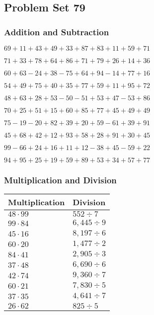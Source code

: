 \hypertarget{problem-set-79}{%
\subsection{Problem Set 79}\label{problem-set-79}}

\hypertarget{addition-and-subtraction}{%
\subsubsection{Addition and
Subtraction}\label{addition-and-subtraction}}

\(69+11+43+49+33+87+83+11+59+71\)

\(71+33+78+64+86+71+79+26+14+36\)

\(60+63-24+38-75+64+94-14+77+16\)

\(54+49+75+40+35+77+59+11+95+72\)

\(48+63+28+53-50-51+53+47-53+86\)

\(70+25+51+15+60+85+77+45+49+49\)

\(75-19-20+82+39+20+59-61+39+91\)

\(45+68+42+12+93+58+28+91+30+45\)

\(99-66+24+16+11+12-38+45-59+22\)

\(94+95+25+19+59+89+53+34+57+77\)

\hypertarget{multiplication-and-division}{%
\subsubsection{Multiplication and
Division}\label{multiplication-and-division}}

\begin{longtable}[]{@{}ll@{}}
\toprule
Multiplication & Division\tabularnewline
\midrule
\endhead
\(48\cdot99\) & \(552÷7\)\tabularnewline
\(99\cdot84\) & \(6,445÷9\)\tabularnewline
\(45\cdot16\) & \(8,197÷6\)\tabularnewline
\(60\cdot20\) & \(1,477÷2\)\tabularnewline
\(84\cdot41\) & \(2,905÷3\)\tabularnewline
\(37\cdot48\) & \(6,690÷6\)\tabularnewline
\(42\cdot74\) & \(9,360÷7\)\tabularnewline
\(60\cdot21\) & \(7,830÷5\)\tabularnewline
\(37\cdot35\) & \(4,641÷7\)\tabularnewline
\(26\cdot62\) & \(825÷5\)\tabularnewline
\bottomrule
\end{longtable}
